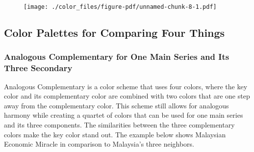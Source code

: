 \documentclass[
  letterpaper,
]{book}
\begin{document}
\begin{figure}[H]

{\centering \texttt{[image: ./color\_files/figure-pdf/unnamed-chunk-8-1.pdf]}

}

\end{figure}

\hypertarget{color-palettes-for-comparing-four-things}{%
\subsection{Color Palettes for Comparing Four
Things}\label{color-palettes-for-comparing-four-things}}

\hypertarget{analogous-complementary-for-one-main-series-and-its-three-secondary}{%
\subsubsection{Analogous Complementary for One Main Series and Its Three
Secondary}\label{analogous-complementary-for-one-main-series-and-its-three-secondary}}

Analogous Complementary is a color scheme that uses four colors, where
the key color and its complementary color are combined with two colors
that are one step away from the complementary color. This scheme still
allows for analogous harmony while creating a quartet of colors that can
be used for one main series and its three components. The similarities
between the three complementary colors make the key color stand out. The
example below shows Malaysian Economic Miracle in comparison to
Malaysia's three neighbors.
\end{document}
